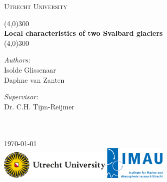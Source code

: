 \documentclass[11pt]{report}
\begin{document}
\begin{titlepage}
	\begin{center}
	\vspace*{0\textheight}
	{\scshape\LARGE Utrecht University \par} 
	\vspace{1cm} 
	\line(4,0){300}
	\vspace{0.5cm} \\
	{\Large \bfseries Local characteristics of two Svalbard glaciers\\}
	\vspace{0.5cm}
	\line(4,0){300} \\

	\vspace{2.5cm}
	\begin{minipage}[t]{0.4\textwidth}
	\begin{flushleft} \large
	\emph{Authors:}\\
	{Isolde Glissenaar}\\
	{Daphne van Zanten} \\
	\end{flushleft}
	\end{minipage} %
	\begin{minipage}[t]{0.4\textwidth}
	\begin{flushright} \large
	\emph{Supervisor:} \\
	{Dr. C.H. Tijm-Reijmer}\\
	\end{flushright}
	\end{minipage}\\[0.4cm]

	\vspace{3.5cm} 
	\large \textit{}\\[1cm]

	{\large {\today}\\[2cm] %

	\noindent
	\includegraphics[scale=1, width=0.4\textwidth]{UU-logo.jpg}
	\hspace{0.2\textwidth}
	\includegraphics[scale=1, width=0.22\textwidth]{imau.png}}
	\end{center}
\end{titlepage}
\end{document}
